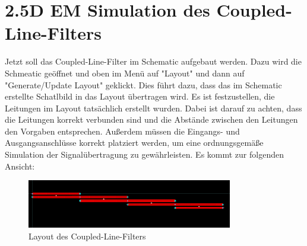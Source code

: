 \section{2.5D EM Simulation des Coupled-Line-Filters}

Jetzt soll das Coupled-Line-Filter im Schematic aufgebaut werden. Dazu wird die Schmeatic geöffnet und oben im Menü auf "Layout" und dann auf "Generate/Update Layout" geklickt. Dies führt dazu, dass das im Schematic erstellte Schatlbild in das Layout übertragen wird. Es ist festzustellen, die Leitungen im Layout tatsächlich erstellt wurden. Dabei ist darauf zu achten, dass die Leitungen korrekt verbunden sind und die Abstände zwischen den Leitungen den Vorgaben entsprechen. Außerdem müssen die Eingangs- und Ausgangsanschlüsse korrekt platziert werden, um eine ordnungsgemäße Simulation der Signalübertragung zu gewährleisten.
Es kommt zur folgenden Ansicht:
\begin{figure}[H]
    \centering
    \includegraphics[width=0.8\textwidth]{Pictures/LayoutohneKnick.png}
    \caption{Layout des Coupled-Line-Filters}
\end{figure}

